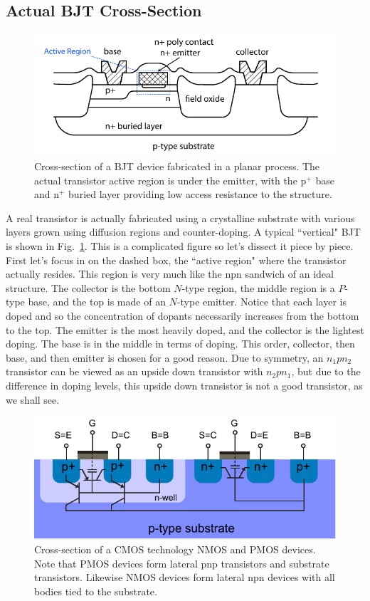 \subsection{Actual BJT Cross-Section}
\begin{figure}[tb]
\centering
\includegraphics[width=.75\columnwidth]{slide3_bjtcross}
\caption{Cross-section of a BJT device fabricated in a planar process.  The actual transistor active region is under the emitter, with the p$^+$ base and n$^+$ buried layer providing low access resistance to the structure.}
\label{fig:slide3_bjtcross}
\end{figure}
A real transistor is actually fabricated using a crystalline substrate with various layers grown using diffusion regions and counter-doping.  A typical ``vertical" BJT is shown in Fig.~\ref{fig:slide3_bjtcross}.  This is a complicated figure so let's dissect it piece by piece.   First let's focus in on the dashed box, the ``active region" where the transistor actually resides.  This region is very much like the npn sandwich of an ideal structure.  The collector is the bottom $N$-type region, the middle region is a $P$-type base, and the top is made of an $N$-type emitter.  Notice that each layer is doped and so the concentration of dopants necessarily increases from the bottom to the top. The emitter is the most heavily doped, and the collector is the lightest doping. The base is in the middle in terms of doping.  This order, collector, then base, and then emitter is chosen for a good reason.  Due to symmetry, an $n_1 p n_2$ transistor can be viewed as an upside down transistor with $n_2 p n_1$, but due to the difference in doping levels, this upside down transistor is not a good transistor, as we shall see.  
\begin{figure}[tb]
\centering
\includegraphics[width=.75\columnwidth]{mos_bjt}
\caption{Cross-section of a CMOS technology NMOS and PMOS devices.  Note that PMOS devices form lateral pnp transistors and substrate transistors.  Likewise NMOS devices form lateral npn devices with all bodies tied to the substrate.}
\label{fig:mos_bjt}
\end{figure}
